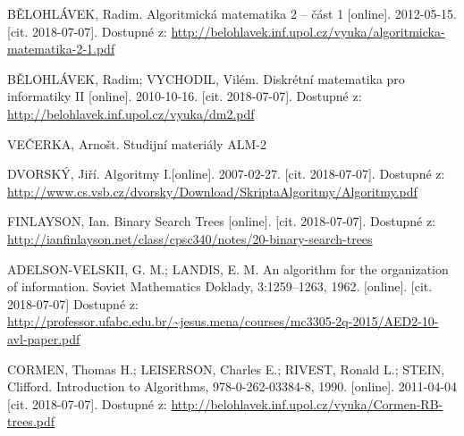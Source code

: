 \documentclass[
  biblatex=false,
  font=serif,
  glossaries=false,
  tables=false,
  theorems=false,
  index
]{kidiplom}
\begin{document}



\nocite{*}


\newpage


\begin{thebibliography}{99}	

 \uppercase{BĚlohlávek}, Radim. Algoritmická matematika 2 -- část 1 [online]. 2012-05-15. [cit. 2018-07-07]. Dostupné z: \url{http://belohlavek.inf.upol.cz/vyuka/algoritmicka-matematika-2-1.pdf}

 \uppercase{BĚlohlávek}, Radim; \uppercase{Vychodil}, Vilém. Diskrétní matematika pro informatiky II [online]. 2010-10-16. [cit. 2018-07-07]. Dostupné z: \url{http://belohlavek.inf.upol.cz/vyuka/dm2.pdf}

 \uppercase{veČerka}, Arnošt. Studijní materiály ALM-2

 \uppercase{DvorskÝ}, Jiří. Algoritmy I.[online]. 2007-02-27. [cit. 2018-07-07]. Dostupné z: \url{http://www.cs.vsb.cz/dvorsky/Download/SkriptaAlgoritmy/Algoritmy.pdf}

 \uppercase{Finlayson}, Ian. Binary Search Trees [online]. [cit. 2018-07-07].
Dostupné z: \url{http://ianfinlayson.net/class/cpsc340/notes/20-binary-search-trees}

 \uppercase{Adelson-Velskii}, G. M.; \uppercase{Landis}, E. M. An algorithm for the organization of information. Soviet Mathematics Doklady, 3:1259–1263, 1962. [online]. [cit. 2018-07-07] Dostupné z: \url{http://professor.ufabc.edu.br/~jesus.mena/courses/mc3305-2q-2015/AED2-10-avl-paper.pdf}

 \uppercase{Cormen}, Thomas H.; \uppercase{Leiserson}, Charles E.; \uppercase{Rivest}, Ronald L.; \uppercase{Stein}, Clifford. Introduction to Algorithms, 978-0-262-03384-8, 1990. [online]. 2011-04-04  [cit. 2018-07-07]. Dostupné z: \url{http://belohlavek.inf.upol.cz/vyuka/Cormen-RB-trees.pdf}


\end{thebibliography}
\end{document}
